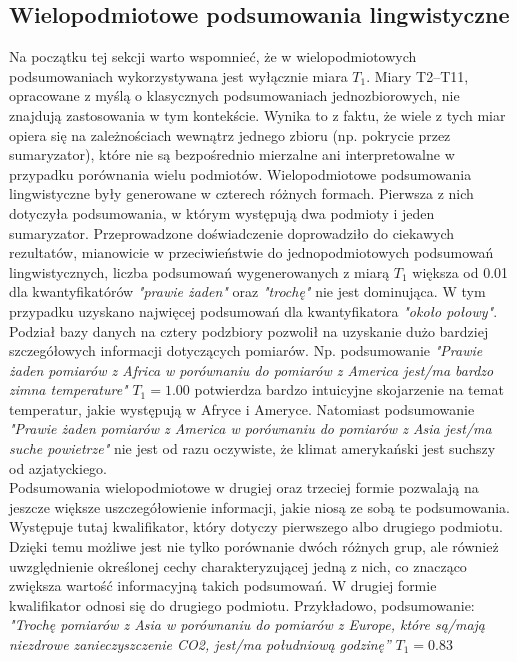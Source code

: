 \documentclass{article}
\begin{document}
\subsection{Wielopodmiotowe podsumowania lingwistyczne}
Na początku tej sekcji warto wspomnieć, że w wielopodmiotowych podsumowaniach wykorzystywana jest wyłącznie miara \(T_1\). Miary T2–T11, opracowane z myślą o klasycznych podsumowaniach jednozbiorowych, nie znajdują zastosowania w tym kontekście. Wynika to z faktu, że wiele z tych miar opiera się na zależnościach wewnątrz jednego zbioru (np. pokrycie przez sumaryzator), które nie są bezpośrednio mierzalne ani interpretowalne w przypadku porównania wielu podmiotów. Wielopodmiotowe podsumowania lingwistyczne były generowane w czterech różnych formach. Pierwsza z nich dotyczyła podsumowania, w którym występują dwa podmioty i jeden sumaryzator. Przeprowadzone doświadczenie doprowadziło do ciekawych rezultatów, mianowicie w przeciwieństwie do jednopodmiotowych podsumowań lingwistycznych, liczba podsumowań wygenerowanych z miarą \(T_1\) większa od 0.01 dla kwantyfikatórów \textit{"prawie żaden"} oraz \textit{"trochę"} nie jest dominująca. W tym przypadku uzyskano najwięcej podsumowań dla kwantyfikatora \textit{"około połowy"}. Podział bazy danych na cztery podzbiory pozwolił na uzyskanie dużo bardziej szczegółowych informacji dotyczących pomiarów. Np. podsumowanie \textit{"Prawie żaden pomiarów z Africa w porównaniu do pomiarów z America jest/ma bardzo zimna temperature"} \(T_1 = 1.00\) potwierdza bardzo intuicyjne skojarzenie na temat temperatur, jakie występują  w Afryce i Ameryce. Natomiast podsumowanie \textit{"Prawie żaden pomiarów z America w porównaniu do pomiarów z Asia jest/ma suche powietrze"} nie jest od razu oczywiste, że klimat amerykański jest suchszy od azjatyckiego. \\
Podsumowania wielopodmiotowe w drugiej oraz trzeciej formie pozwalają na jeszcze większe uszczegółowienie informacji, jakie niosą ze sobą te podsumowania. Występuje tutaj kwalifikator, który dotyczy pierwszego albo drugiego podmiotu. Dzięki temu możliwe jest nie tylko porównanie dwóch różnych grup, ale również uwzględnienie określonej cechy charakteryzującej jedną z nich, co znacząco zwiększa wartość informacyjną takich podsumowań. W drugiej formie kwalifikator odnosi się do drugiego podmiotu. Przykładowo, podsumowanie: \textit{"Trochę pomiarów z Asia w porównaniu do pomiarów z Europe, które są/mają niezdrowe zanieczyszczenie CO2, jest/ma południową godzinę”} \(T_1 = 0.83\)
\end{document}
